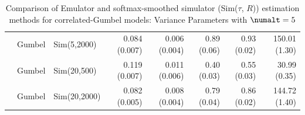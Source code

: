 \begin{table}[htbp]
\begin{tabular}{@{}rllrrrrr@{}}
 & Gumbel & Sim(5,2000) & 0.084 (0.007) & 0.006 (0.004) & 0.89 (0.06) & 0.93 (0.02) & 150.01 (1.30) \\
 & Gumbel & Sim(20,500) & 0.119 (0.007) & 0.011 (0.006) & 0.40 (0.03) & 0.55 (0.03) & 30.99 (0.35) \\
 & Gumbel & Sim(20,2000) & 0.082 (0.005) & 0.008 (0.004) & 0.79 (0.04) & 0.86 (0.02) & 144.72 (1.40) \\
\bottomrule
\end{tabular}
\caption{Comparison of Emulator and softmax-smoothed simulator (Sim($\tau$, $R$)) estimation methods for correlated-Gumbel models: Variance Parameters with $\numalt=5$}
\label{tab:emulator_vs_sim_gumbel:5:variance}
\end{table}